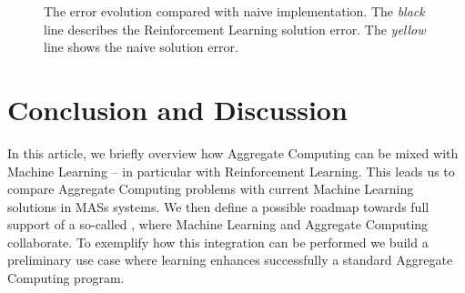 \documentclass[
  twocolumn,
]{ceurart}
\begin{document}
\begin{figure}
\begin{subfigure}[b]{0.3\textwidth}
  \end{subfigure}
  \caption{The error evolution compared with naive implementation. The \textit{black} line 
  describes the Reinforcement Learning solution error. The \textit{yellow} line shows
  the naive solution error.}
  \label{fig:simulation}
\end{figure}

\section{Conclusion and Discussion}
In this article, we briefly overview how Aggregate Computing can be mixed with Machine Learning -- 
 in particular with Reinforcement Learning. 
 This leads us to compare Aggregate Computing problems with current Machine Learning solutions in MASs systems.
%
We then define a possible roadmap towards full support of a so-called \hybridaggregate{}, 
 where Machine Learning and Aggregate Computing collaborate.
%
To exemplify how this integration can be performed we build a preliminary use case where 
 learning enhances successfully a standard Aggregate Computing program.

\nocite{*}


\appendix
\end{document}
